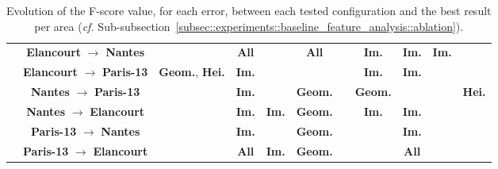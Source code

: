 \begin{table}[htbp]
\begin{tabular}{| c | c | x{1.5cm} c c c |c c c c c|}
                \hline
                & \textbf{Elancourt} \(\rightarrow\) \textbf{Nantes} &  &  \textbf{All} &  &  \textbf{All} &  &  \textbf{Im.} &  \textbf{Im.} &  \textbf{Im.} &  \\
                & \textbf{Elancourt} \(\rightarrow\) \textbf{Paris-13} &  \textbf{Geom.}, \textbf{Hei.} &  \textbf{Im.} &  &  &  &  \textbf{Im.} &  \textbf{Im.} &  &  \\
                & \textbf{Nantes} \(\rightarrow\) \textbf{Paris-13} &  &  \textbf{Im.} &  &  \textbf{Geom.} &  &  \textbf{Geom.} &  &  &  \textbf{Hei.} \\
                & \textbf{Nantes} \(\rightarrow\) \textbf{Elancourt} &  &  \textbf{Im.} &  \textbf{Im.} &  \textbf{Geom.} &  &  \textbf{Im.} &  \textbf{Im.} &  &  \\
                & \textbf{Paris-13} \(\rightarrow\) \textbf{Nantes} &  &  \textbf{Im.} &  &  \textbf{Geom.} &  &  &  \textbf{Im.} &  &  \\
                & \textbf{Paris-13} \(\rightarrow\) \textbf{Elancourt} &  &  \textbf{All} &  \textbf{Im.} &  \textbf{Geom.} &  &  &  \textbf{All} &  & \\
                \hline                                            
            \end{tabular}
            \renewcommand{\arraystretch}{1}
            \caption{
                \label{tab::transferability_comparison} Evolution of the F-score value, for each error, between each tested configuration and the best result per area (\textit{cf.} Sub-subsection~\ref{subsec::experiments::baseline_feature_analysis::ablation}).
}
\end{table}

